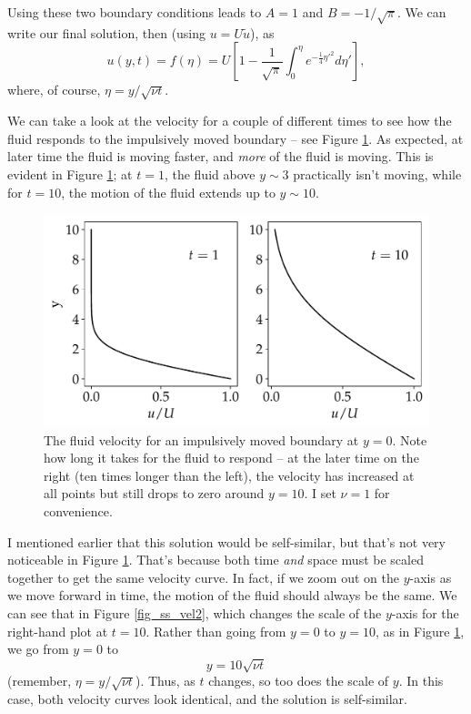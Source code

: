 Using these two boundary conditions leads to $A=1$ and $B = -1/\sqrt{\pi}$.  We can write our final solution, then (using $u = U\tilde{u}$), as
\begin{equation}
u(y, t) = f(\eta) = U\left[ 1 - \frac{1}{\sqrt{\pi}} \int_0^\eta e^{-\tfrac{1}{4} \eta'^2} d\eta' \right],
\end{equation}
where, of course, $\eta = y / \sqrt{\nu t}$.

We can take a look at the velocity for a couple of different times to see how the fluid responds to the impulsively moved boundary -- see Figure \ref{fig_ss_vel1}.  As expected, at later time the fluid is moving faster, and \emph{more} of the fluid is moving.  This is evident in Figure \ref{fig_ss_vel1}; at $t=1$, the fluid above $y \sim 3$ practically isn't moving, while for $t=10$, the motion of the fluid extends up to $y \sim 10$.

\begin{figure}
\centering
\includegraphics[width=0.8\linewidth]{Figures/Chapter2/fig_ss_vel1}
\caption{The fluid velocity for an impulsively moved boundary at $y=0$.  Note how long it takes for the fluid to respond -- at the later time on the right (ten times longer than the left), the velocity has increased at all points but still drops to zero around $y=10$.  I set $\nu = 1$ for convenience. }
\label{fig_ss_vel1}
\end{figure}

I mentioned earlier that this solution would be self-similar, but that's not very noticeable in Figure \ref{fig_ss_vel1}.  That's because both time \emph{and} space must be scaled together to get the same velocity curve.  In fact, if we zoom out on the $y$-axis as we move forward in time, the motion of the fluid should always be the same.  We can see that in Figure \ref{fig_ss_vel2}, which changes the scale of the $y$-axis for the right-hand plot at $t=10$.  Rather than going from $y=0$ to $y=10$, as in Figure \ref{fig_ss_vel1}, we go from $y=0$ to
\[
y = {10}{\sqrt{\nu t}}
\]
(remember, $\eta = y / \sqrt{\nu t}$).  Thus, as $t$ changes, so too does the scale of $y$.  In this case, both velocity curves look identical, and the solution is self-similar.

